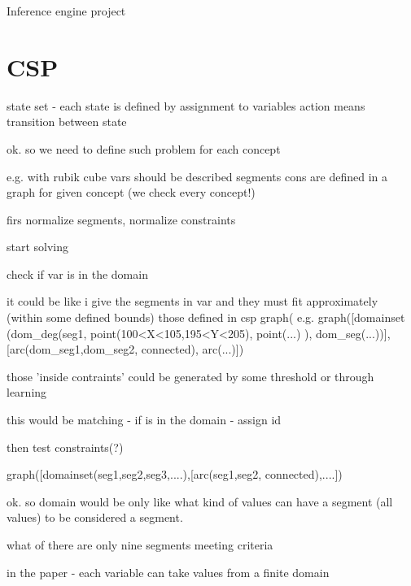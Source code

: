 \documentclass[10pt,a4paper]{report}
\begin{document}
\begin{LARGE}
\begin{center}
Inference engine project
\end{center}
\end{LARGE} 

\section{CSP}

state set - each state is defined by assignment to variables
action means transition between state

ok. so we need to define such problem for each concept

e.g. with rubik cube vars should be described segments
cons are defined in a graph for given concept (we check every concept!)

firs normalize segments, normalize constraints

start solving

check if var is in the domain

	it could be like i give the segments in var and they must fit approximately (within some defined bounds) those defined in csp graph( e.g. graph([domainset (dom_deg(seg1, point(100<X<105,195<Y<205), point(...) ), dom_seg(...))], [arc(dom_seg1,dom_seg2, connected), arc(...)])

those 'inside contraints' could be generated by some threshold or through learning

this would be matching - if is in the domain - assign id

then test constraints(?)

graph([domainset(seg1,seg2,seg3,....),[arc(seg1,seg2, connected),....])

ok. so domain would be only like what kind of values can have a segment (all values) to be considered a segment.

what of there are only nine segments meeting criteria

in the paper - each variable can take values from a finite domain
\end{document}

